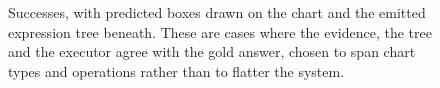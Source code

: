 \begin{figure}[t]
\centering
\caption{Successes, with predicted boxes drawn on the chart and the emitted expression tree beneath. These are cases where the evidence, the tree and the executor agree with the gold answer, chosen to span chart types and operations rather than to flatter the system.}
\label{fig:qualitative_success}
\end{figure}
